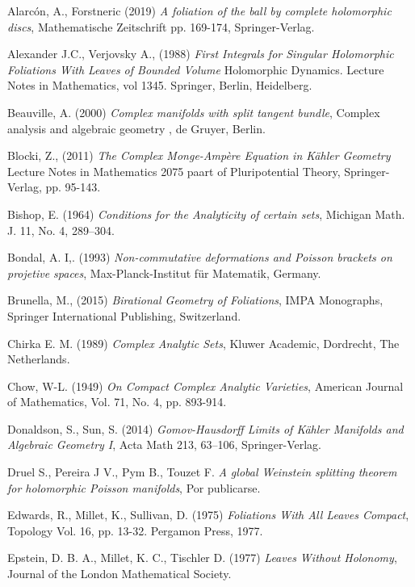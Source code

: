 \documentclass{article}
\begin{document}
\begin{thebibliography}{3}

 Alarc\'on, A., Forstneric (2019) \textit{A foliation of the ball by complete holomorphic discs}, Mathematische Zeitschrift
pp. 169-174, Springer-Verlag.

 Alexander J.C., Verjovsky A., (1988) \textit{First Integrals for Singular Holomorphic Foliations With Leaves of Bounded Volume}
Holomorphic Dynamics. Lecture Notes in Mathematics, vol 1345. Springer, Berlin, Heidelberg.

 Beauville, A. (2000) \textit{Complex manifolds with split tangent bundle}, Complex analysis and algebraic geometry
, de Gruyer, Berlin.

 Blocki, Z., (2011) \textit{The Complex Monge-Amp\`ere Equation in K\"ahler Geometry} Lecture Notes in Mathematics 2075
paart of Pluripotential Theory, Springer-Verlag, pp. 95-143.

 Bishop, E. (1964) \textit{Conditions for the Analyticity  of certain sets}, Michigan Math. J. 11, No. 4, 289--304. 

 Bondal, A. I,. (1993) \textit{Non-commutative deformations and Poisson brackets on projetive spaces}, 
Max-Planck-Institut f\"ur Matematik, Germany.

 Brunella, M., (2015) \textit{Birational Geometry of Foliations}, IMPA Monographs, 
Springer International Publishing, Switzerland.

 Chirka E. M. (1989) \textit{Complex Analytic Sets}, Kluwer
Academic, Dordrecht, The Netherlands. 

 Chow, W-L. (1949) \textit{On Compact Complex Analytic Varieties},
American Journal of Mathematics, Vol. 71, No. 4, pp. 893-914.

 Donaldson, S., Sun, S. (2014) \textit{Gomov-Hausdorff Limits of K\"ahler Manifolds and Algebraic Geometry I},
 Acta Math 213, 63–106, Springer-Verlag.

Druel S., Pereira J V., Pym B., Touzet F. \textit{A global Weinstein splitting theorem for 
holomorphic Poisson manifolds}, Por publicarse.

 Edwards, R., Millet, K., Sullivan, D. (1975) \textit{Foliations
With All Leaves Compact}, Topology Vol. 16, pp. 13-32. Pergamon Press, 1977.

 Epstein, D. B. A., Millet, K. C., Tischler D.
(1977) \textit{Leaves Without Holonomy}, Journal of the London Mathematical
Society.


\end{thebibliography}
\end{document}
